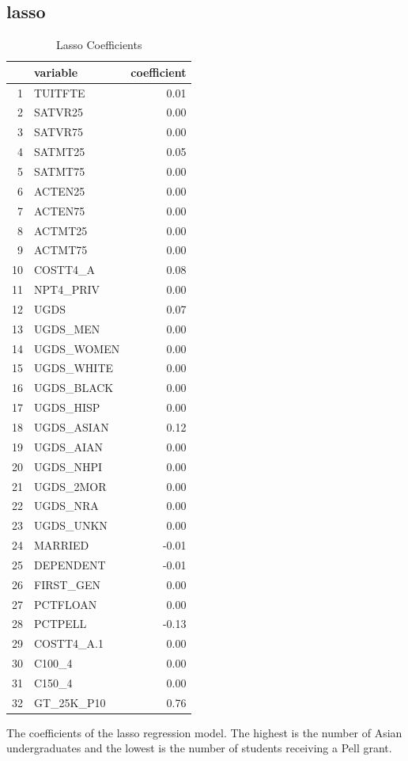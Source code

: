 \documentclass{article}
\begin{document}
\subsection{lasso}

\begin{table}[ht]
\centering
\begin{tabular}{rlr}
  \hline
 & variable & coefficient \\ 
  \hline
1 & TUITFTE & 0.01 \\ 
  2 & SATVR25 & 0.00 \\ 
  3 & SATVR75 & 0.00 \\ 
  4 & SATMT25 & 0.05 \\ 
  5 & SATMT75 & 0.00 \\ 
  6 & ACTEN25 & 0.00 \\ 
  7 & ACTEN75 & 0.00 \\ 
  8 & ACTMT25 & 0.00 \\ 
  9 & ACTMT75 & 0.00 \\ 
  10 & COSTT4\_A & 0.08 \\ 
  11 & NPT4\_PRIV & 0.00 \\ 
  12 & UGDS & 0.07 \\ 
  13 & UGDS\_MEN & 0.00 \\ 
  14 & UGDS\_WOMEN & 0.00 \\ 
  15 & UGDS\_WHITE & 0.00 \\ 
  16 & UGDS\_BLACK & 0.00 \\ 
  17 & UGDS\_HISP & 0.00 \\ 
  18 & UGDS\_ASIAN & 0.12 \\ 
  19 & UGDS\_AIAN & 0.00 \\ 
  20 & UGDS\_NHPI & 0.00 \\ 
  21 & UGDS\_2MOR & 0.00 \\ 
  22 & UGDS\_NRA & 0.00 \\ 
  23 & UGDS\_UNKN & 0.00 \\ 
  24 & MARRIED & -0.01 \\ 
  25 & DEPENDENT & -0.01 \\ 
  26 & FIRST\_GEN & 0.00 \\ 
  27 & PCTFLOAN & 0.00 \\ 
  28 & PCTPELL & -0.13 \\ 
  29 & COSTT4\_A.1 & 0.00 \\ 
  30 & C100\_4 & 0.00 \\ 
  31 & C150\_4 & 0.00 \\ 
  32 & GT\_25K\_P10 & 0.76 \\ 
   \hline
\end{tabular}
\caption{Lasso Coefficients} 
\end{table}
The coefficients of the lasso regression model. The highest is the number of Asian undergraduates and the lowest is the number of students receiving a Pell grant.
\end{document}
